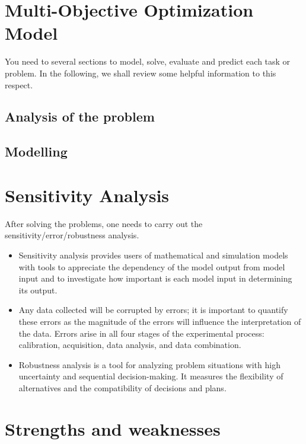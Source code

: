 \documentclass[12pt]{article}  %
\begin{document}
 \section{Multi-Objective Optimization Model}
 
 You need to several sections to model, solve, evaluate and predict each task or problem. In the following, we shall review some helpful information to this respect.
 
 \subsection{Analysis of the problem}
 
 \subsection{Modelling}
 
 

 \section{Sensitivity Analysis}
 
 After solving the problems, one needs to carry out the sensitivity/error/robustness analysis.
 
 \begin{itemize}
     \setlength{\parsep}{0ex} %
     \setlength{\topsep}{2ex} %
     \setlength{\itemsep}{1ex} %
     \item Sensitivity analysis provides users of mathematical and simulation models with tools to appreciate the dependency of the model output from model input and to investigate how important is each model input in determining its output.
     \item Any data collected will be corrupted by errors; it is important to quantify these errors as the magnitude of the errors will influence the interpretation of the data. Errors arise in all four stages of the experimental process: calibration, acquisition, data analysis, and data combination.
     \item Robustness analysis is a tool for analyzing problem situations with high uncertainty and sequential decision-making. It measures the flexibility of alternatives and the compatibility of decisions and plans.
 \end{itemize}
 
 \section{Strengths and weaknesses}
 
\end{document}
